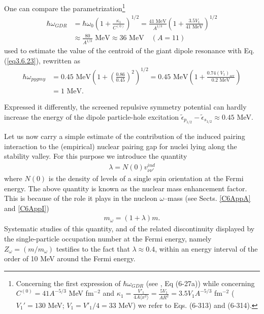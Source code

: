 One can compare the parametrization\footnote{Concerning the first expression of $\hbar\omega_{GDR}$ (see \cite{Bohr:75}, Eq (6-27a)) while concerning $C^{(0)}=41A^{-5/3}$ MeV fm$^{-2}$ and $\kappa_1=\frac{V'_1}{4A\langle x^2\rangle}=\frac{5V_1}{AR^2}=3.5V_1A^{-5/3}$ fm$^{-2}$ ($V_1'=130$ MeV; $V_1=V'_1/4=33$ MeV) we refer to Eqs. (6-313) and (6-314).}
\begin{align}\label{eq4.8.21}
\nonumber\hbar\omega_{GDR}&=\hbar\omega_0\left(1+\frac{\kappa_1}{C^{(0)}}\right)^{1/2}=\frac{41\text{ MeV}}{A^{1/3}}\left(1+\frac{3.5 V_1}{41\text{ MeV}}\right)^{1/2}\\
&\approx\frac{80}{A^{1/3}}\text{ MeV}\approx36\text{ MeV}\quad(A=11)
\end{align}
used to estimate the value of the centroid of the giant dipole resonance with Eq. (\ref{eq3.6.23}), rewritten as
\begin{align}\label{eq4.8.22}
\nonumber\hbar\omega_{pygmy}&=0.45\text{ MeV}\left(1+\left(\frac{0.86}{0.45}\right)^2\right)^{1/2}=0.45\text{ MeV}\left(1+\frac{0.74(V_1)_{scr}}{0.2\text{ MeV}}\right)\\
&=1\text{ MeV}.
\end{align}



Expressed it differently, the screened repulsive symmetry potential can hardly increase the energy of the dipole particle-hole excitation $\tilde\epsilon_{p_{1/2}}-\tilde\epsilon_{s_{1/2}}\approx0.45$ MeV.

Let us now carry a simple estimate of the contribution of the induced pairing interaction to the (empirical) nuclear pairing gap for nuclei lying along the stability valley. For this purpose we introduce the quantity
 \begin{align}
\lambda=N(0)v_{\nu\nu'}^{ind}
 \end{align}
where $N(0)$ is the density of levels of a single spin orientation at the Fermi energy. The above quantity is known as the nuclear mass enhancement factor. This is because of the role it plays in the nucleon $\omega$--mass (see Sects. \ref{C6AppA} and \ref{C6AppI})
 \begin{align}
m_\omega=(1+\lambda)m.
 \end{align}
Systematic studies of this quantity, and of the related discontinuity displayed by the single-particle occupation number at the Fermi energy, namely $Z_\omega=(m/m_\omega)$ testifies to the fact that $\lambda\approx0.4$, within an energy interval of the order of 10 MeV around the Fermi energy.


